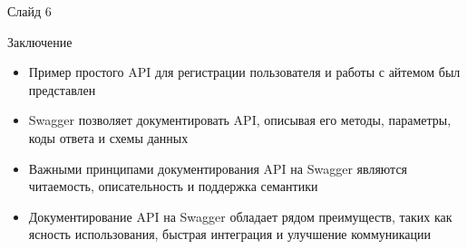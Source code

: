 \documentclass[
  ignorenonframetext,
  aspectratio=169,
  aspectratio=169]{beamer}
\providecommand{\tightlist}{%
  \setlength{\itemsep}{0pt}\setlength{\parskip}{0pt}}
\begin{document}
\begin{frame}{Слайд 6}
\protect\hypertarget{ux441ux43bux430ux439ux434-6}{}
\begin{block}{Заключение}
\protect\hypertarget{ux437ux430ux43aux43bux44eux447ux435ux43dux438ux435}{}
\begin{itemize}
\tightlist
\item
  Пример простого API для регистрации пользователя и работы с айтемом
  был представлен
\item
  Swagger позволяет документировать API, описывая его методы, параметры,
  коды ответа и схемы данных
\item
  Важными принципами документирования API на Swagger являются
  читаемость, описательность и поддержка семантики
\item
  Документирование API на Swagger обладает рядом преимуществ, таких как
  ясность использования, быстрая интеграция и улучшение коммуникации
\end{itemize}
\end{block}
\end{frame}
\end{document}
